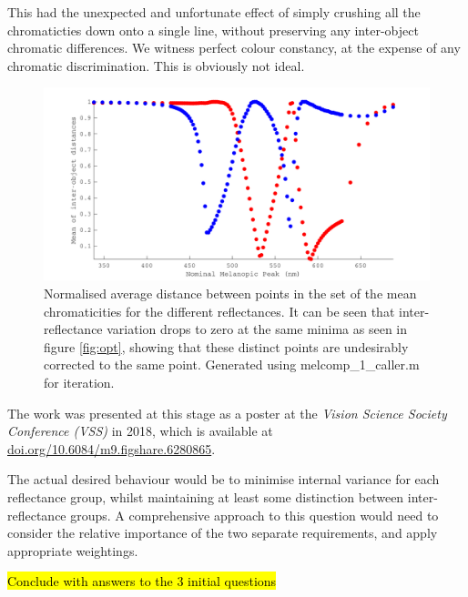 This had the unexpected and unfortunate effect of simply crushing all the chromaticties down onto a single line, without preserving any inter-object chromatic differences. We witness perfect colour constancy, at the expense of any chromatic discrimination. This is obviously not ideal.

\begin{figure}[htbp]
    \includegraphics[max width=\textwidth]{figs/comp/melcomp_1_caller/sdmeans.pdf}
    \caption{Normalised average distance between points in the set of the mean chromaticities for the different reflectances. It can be seen that inter-reflectance variation drops to zero at the same minima as seen in figure \ref{fig:opt}, showing that these distinct points are undesirably corrected to the same point. Generated using melcomp\_1\_caller.m for iteration.}
    \label{fig:sdmeans}
\end{figure} 

The work was presented at this stage as a poster at the \emph{Vision Science Society Conference (VSS)} in 2018, which is available at \url{doi.org/10.6084/m9.figshare.6280865}.

The actual desired behaviour would be to minimise internal variance for each reflectance group, whilst maintaining at least some distinction between inter-reflectance groups. A comprehensive approach to this question would need to consider the relative importance of the two separate requirements, and apply appropriate weightings.

\hl{Conclude with answers to the 3 initial questions}



